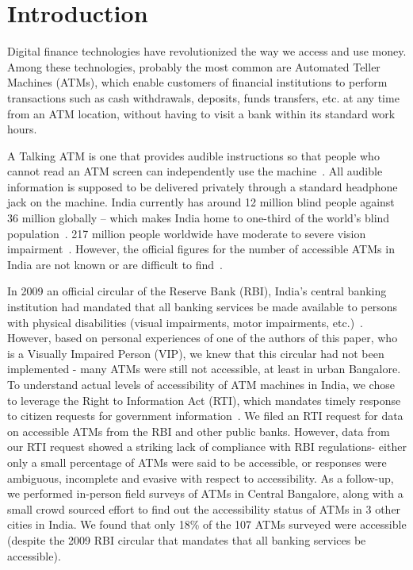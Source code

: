 \section{Introduction}
\label{sec:introduction}
Digital finance technologies have revolutionized the way we access and use money. Among these technologies, probably the most common are Automated Teller Machines (ATMs), which enable customers of financial institutions to perform transactions such as cash withdrawals, deposits, funds transfers, etc. at any time from an ATM location, without having to visit a bank within its standard work hours.

A Talking ATM is one that provides audible instructions so that people who cannot read an ATM screen can independently use the machine~\cite{IBA2013b}. All audible information is supposed to be delivered privately through a standard headphone jack on the machine. India currently has around 12 million blind people against 36 million globally -- which makes India home to one-third of the world's blind population~\cite{dandona2001estimation}. 217 million people worldwide have moderate to severe vision impairment~\cite{bourne2017magnitude}. However, the official figures for the number of accessible ATMs in India are not known or are difficult to find~\cite{pal2016smartphone}.

In 2009 an official circular of the Reserve Bank (RBI), India's central banking institution had mandated that all banking services be made available to persons with physical disabilities (visual impairments, motor impairments, etc.)~\cite{RBI2008}. However, based on personal experiences of one of the authors of this paper, who is a Visually Impaired Person (VIP), we knew that this circular had not been implemented - many ATMs were still not accessible, at least in urban Bangalore. To understand actual levels of accessibility of ATM machines in India, we chose to leverage the Right to Information Act (RTI), which mandates timely response to citizen requests for government information~\cite{RTI2005}. We filed an RTI request for data on accessible ATMs from the RBI and other public banks. However, data from our RTI request showed a striking lack of compliance with RBI regulations- either only a small percentage of ATMs were said to be accessible, or responses were ambiguous, incomplete and evasive with respect to accessibility. As a follow-up, we performed in-person field surveys of ATMs in Central Bangalore, along with a small crowd sourced effort to find out the accessibility status of ATMs in 3 other cities in India. We found that only 18\% of the 107 ATMs surveyed were accessible (despite the 2009 RBI circular that mandates that all banking services be accessible).

